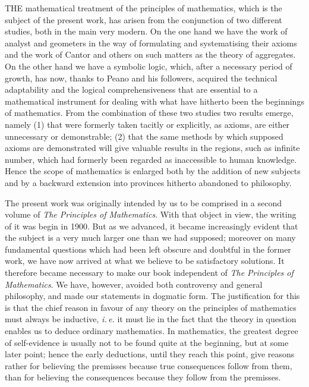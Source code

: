 \documentclass{scrartcl}
\begin{document}
\lettrine[lines=2]{T}HE mathematical treatment of the principles of mathematics, which is the subject of the present work, has arisen
from the conjunction of two different studies, both in the main very modern. On the one hand we have the work of analyst and geometers
in the way of formulating and systematising their axioms and the work of Cantor and others on such matters as the theory of aggregates.
On the other hand we have a symbolic logic, which, after a necessary period of growth, has now, thanks to Peano and his followers,
acquired the technical adaptability and the logical comprehensiveness that are essential to a mathematical instrument for dealing with
what have hitherto been the beginnings of mathematics. From the combination of these two studies two results emerge, namely (1) that were
formerly taken tacitly or explicitly, as axioms, are either unnecessary or demonstrable; (2) that the same methods by which supposed
axioms are demonstrated will give valuable results in the regions, such as infinite number, which had formerly been regarded as inaccessible
to human knowledge. Hence the scope of mathematics is enlarged both by the addition of new subjects and by a backward extension into provinces
hitherto abandoned to philosophy.

The present work was originally intended by us to be comprised in a second volume of \textit{The Principles of Mathematics}. With that object in
view, the writing of it was begin in 1900. But as we advanced, it became increasingly evident that the subject is a very much larger one than we had
supposed; moreover on many fundamental questions which had been left obscure and doubtful in the former work, we have now arrived at what we
believe to be satisfactory solutions. It therefore became necessary to make our book independent of \textit{The Principles of Mathematics}. We have,
however, avoided both controversy and general philosophy, and made our statements in dogmatic form. The justification for this is that the chief reason
in favour of any theory on the principles of mathematics must always be inductive, \textit{i.\,e.} it must lie in the fact that the theory in question
enables us to deduce ordinary mathematics. In mathematics, the greatest degree of self-evidence is usually not to be found quite at the beginning, but
at some later point; hence the early deductions, until they reach this point, give reasons rather for believing the premisses because true consequences
follow from them, than for believing the consequences because they follow from the premisses.
\end{document}
